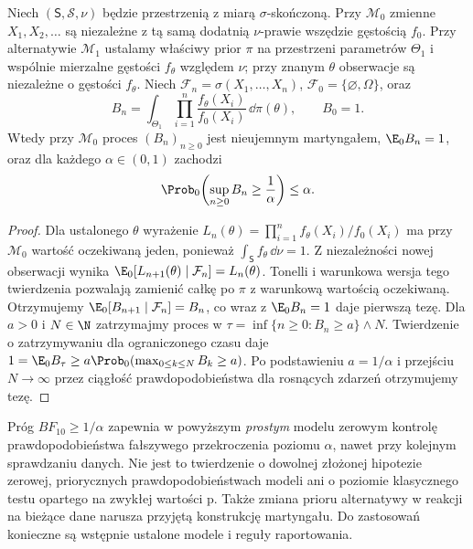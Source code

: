 \begin{twierdzenie}
\label{thm:bayes-factor-martingale}
Niech $(\mathsf S,\mathcal S,\nu)$ będzie przestrzenią
z miarą $\sigma$-skończoną. Przy $\mathcal M_0$ zmienne
$X_1,X_2,\ldots$ są niezależne z tą samą dodatnią
$\nu$-prawie wszędzie gęstością $f_0$.
Przy alternatywie $\mathcal M_1$ ustalamy właściwy prior
$\pi$ na przestrzeni parametrów $\Theta_1$ i
wspólnie mierzalne gęstości $f_\theta$ względem $\nu$;
przy znanym $\theta$ obserwacje są niezależne o gęstości
$f_\theta$. Niech $\mathcal F_n=\sigma(X_1,\ldots,X_n)$,
$\mathcal F_0=\{\varnothing,\Omega\}$, oraz
\[
 B_n=\int_{\Theta_1}\prod_{i=1}^n
    \frac{f_\theta(X_i)}{f_0(X_i)}\,\dd\pi(\theta),
 \qquad B_0=1.
\]
Wtedy przy $\mathcal M_0$ proces $(B_n)_{n\ge0}$ jest
nieujemnym martyngałem, $\E_0 B_n=1$, oraz dla
każdego $\alpha\in(0,1)$ zachodzi
\[
 \Prob_0\!\left(\sup_{n\ge0}B_n\ge\frac1\alpha\right)
 \le\alpha.
\]
\end{twierdzenie}
\begin{proof}
Dla ustalonego $\theta$ wyrażenie
$L_n(\theta)=\prod_{i=1}^n f_\theta(X_i)/f_0(X_i)$
ma przy $\mathcal M_0$ wartość oczekiwaną jeden, ponieważ
$\int_{\mathsf S} f_\theta\,\dd\nu=1$.
Z niezależności nowej obserwacji wynika
$\E_0[L_{n+1}(\theta)\mid\mathcal F_n]=L_n(\theta)$.
Tonelli i warunkowa wersja tego twierdzenia pozwalają
zamienić całkę po $\pi$ z warunkową wartością oczekiwaną.
Otrzymujemy $\E_0[B_{n+1}\mid\mathcal F_n]=B_n$,
co wraz z $\E_0B_n=1$ daje pierwszą tezę.
Dla $a>0$ i $N\in\N$ zatrzymajmy proces w
$\tau=\inf\{n\ge0:B_n\ge a\}\wedge N$.
Twierdzenie o zatrzymywaniu dla ograniczonego czasu daje
$1=\E_0 B_\tau\ge a\Prob_0(\max_{0\le k\le N}B_k\ge a)$.
Po podstawieniu $a=1/\alpha$ i przejściu $N\to\infty$
przez ciągłość prawdopodobieństwa dla rosnących zdarzeń
otrzymujemy tezę.
\end{proof}

\begin{uwaga}
Próg $BF_{10}\ge1/\alpha$ zapewnia w powyższym
\emph{prostym} modelu zerowym kontrolę prawdopodobieństwa
fałszywego przekroczenia poziomu $\alpha$, nawet przy
kolejnym sprawdzaniu danych. Nie jest to twierdzenie
o dowolnej złożonej hipotezie zerowej, priorycznych
prawdopodobieństwach modeli ani o poziomie klasycznego
testu opartego na zwykłej wartości p. Także zmiana prioru
alternatywy w reakcji na bieżące dane narusza przyjętą
konstrukcję martyngału. Do zastosowań konieczne są
wstępnie ustalone modele i reguły raportowania.
\end{uwaga}

